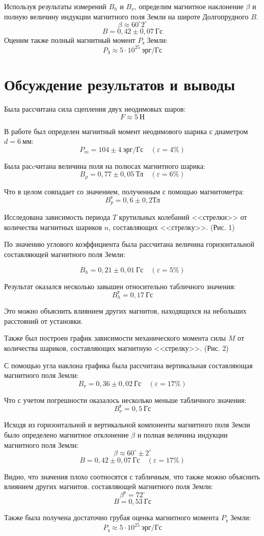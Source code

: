 Используя результаты измерений $B_h$ и $B_\nu$, определим магнитное наклонение $\beta$ и полную
величину индукции магнитного поля Земли на широте Долгопрудного $B$. 
     \[   \beta  \approx 60^\circ 2^\circ\]
     \[   B = 0,42 \pm 0,07 \ \text{Гс}\]
Оценим также полный магнитный момент $P_\text{з}$ Земли:
\[ P_\text{З} \approx 5\cdot 10^{25}\ \text{эрг}/\text{Гс} \]

\section{Обсуждение результатов и выводы}
Была рассчитана сила сцепления двух неодимовых шаров:
\[ F \approx 5\ \text{Н}\]

В работе был определен магнитный момент неодимового шарика с диаметром $d = 6\ \text{мм}$:
\[P_m = 104 \pm 4\ \text{эрг}/\text{Гс}\quad (\varepsilon = 4\%)\]

Была расcчитана величина поля на полюсах магнитного шарика:
\[ B_p = 0,77 \pm 0,05\ \text{Тл} \quad (\varepsilon = 6\%) \]

Что в целом совпадает со значением, полученным с помощью магнитометра:
\[ B_p^\text{т} = 0,6 \pm 0,2 \text{Тл} \]

Исследована зависимость периода $T$ крутильных колебаний <<стрелки>> от количества магнитных
шариков $n$, составляющих <<стрелку>>. (Рис. 1)

По значению углового коэффициента была рассчитана величина горизонтальной составляющей
магнитного поля Земли:

\[ B_h = 0,21 \pm 0,01\ \text{Гс} \quad (\varepsilon= 5\%)\]

Результат оказался несколько завышен относительно табличного значения:
\[ B_h^\text{т} = 0,17\ \text{Гс} \]

Это можно объяснить влиянием других магнитов, находящихся на небольших расстояний от
установки.

Также был построен график зависимости механического момента силы $M$ от количества шариков,
составляющих магнитную <<стрелку>>. (Рис. 2)

С помощью угла наклона графика была рассчитана вертикальная составляющая магнитного поля
Земли: 
\[ B_\nu = 0,36 \pm 0,02\ \text{Гс} \quad (\varepsilon = 17\%)  \]

Что с учетом погрешности оказалось  несколько меньше табличного значения:
\[ B_\nu^\text{т} = 0,5 \ \text{Гс} \]

Исходя из горизонтальной и вертикальной компоненты магнитного поля Земли было определено
магнитное отклонение $\beta$ и полная величина индукции магнитного поля Земли:
\[ \beta \approx 60^\circ \pm 2^\circ \]
\[ B = 0,42 \pm 0,07\ \text{Гс} \quad (\varepsilon = 17\%) \]

Видно, что значения плохо соотносятся с табличным, что также можно объяснить влиянием других
магнитов. 
составляющей магнитного поля Земли:
\[ \beta^\text{т} = 72^\circ \]
\[ B = 0,53 \ \text{Гс}\]

Также была получена достаточно грубая оценка магнитного момента $P_\text{з}$ Земли:
\[P_\text{з} \approx 5 \cdot 10^{25}\ \text{эрг}/\text{Гс} \]



